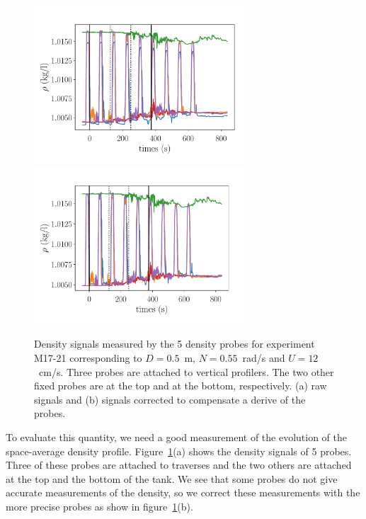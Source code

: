 \begin{figure}[htp!]
\centering
\includegraphics[width=0.7\textwidth]{tmp/fig_rho_vs_time}\\
\includegraphics[width=0.7\textwidth]{tmp/fig_rho_vs_time_corrected}

\caption{Density signals measured by the 5 density probes for experiment M17-21
corresponding to $D = 0.5$~m, $N=0.55$~rad/s and $U=12$~cm/s. Three probes are
attached to vertical profilers. The two other fixed probes are at the top and
at the bottom, respectively. (a) raw signals and (b) signals corrected to
compensate a derive of the probes.
}%
\label{fig:rho:vs:time}

\end{figure}

To evaluate this quantity, we need a good measurement of the evolution of the
space-average density profile. Figure~\ref{fig:rho:vs:time}(a) shows the
density signals of 5 probes. Three of these probes are attached to traverses
and the two others are attached at the top and the bottom of the tank. We see
that some probes do not give accurate measurements of the density, so we
correct these measurements with the more precise probes as show in
figure~\ref{fig:rho:vs:time}(b).

